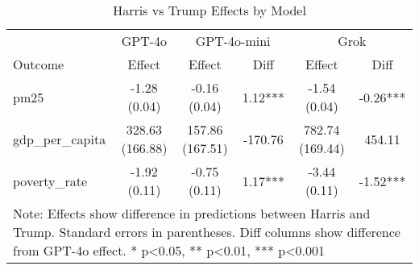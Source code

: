 \begin{table}[htbp]
    \centering
    \caption{Harris vs Trump Effects by Model}
    \begin{tabular}{lccccc}
    \hline
    & \multicolumn{1}{c}{GPT-4o} & \multicolumn{2}{c}{GPT-4o-mini} & \multicolumn{2}{c}{Grok} \\
    Outcome & Effect & Effect & Diff & Effect & Diff \\
    \hline
    pm25 & -1.28 (0.04) & -0.16 (0.04) & 1.12*** & -1.54 (0.04) & -0.26*** \\
gdp_per_capita & 328.63 (166.88) & 157.86 (167.51) & -170.76 & 782.74 (169.44) & 454.11 \\
poverty_rate & -1.92 (0.11) & -0.75 (0.11) & 1.17*** & -3.44 (0.11) & -1.52*** \\
\hline
    \multicolumn{6}{p{0.95\textwidth}}{\small Note: Effects show difference in predictions between Harris and Trump. 
    Standard errors in parentheses. Diff columns show difference from GPT-4o effect. * p<0.05, ** p<0.01, *** p<0.001} \\
    \end{tabular}
    \label{tab:model_comparison}
    \end{table}